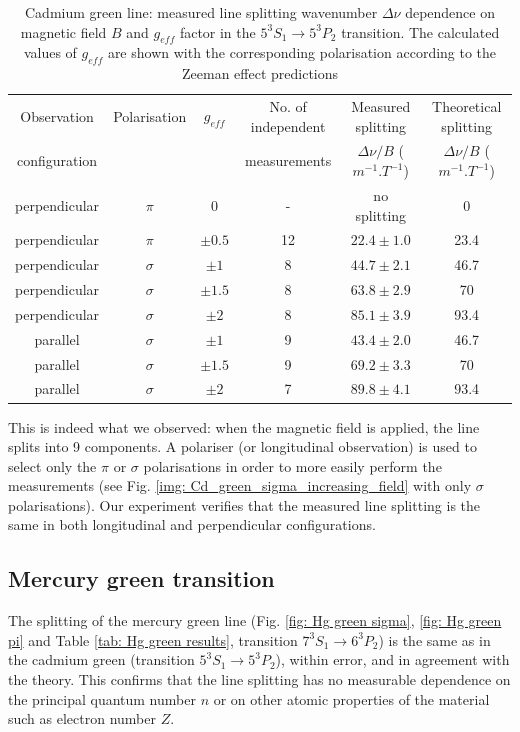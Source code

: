 \documentclass[11pt]{article}
\begin{document}
\begin{table}[h!]
    \centering
    \begin{tabular}{c|ccccc}
    \toprule
        Observation & Polarisation  & \( g_{eff} \) & No. of independent & Measured splitting  & Theoretical splitting \\
        configuration & & & measurements & $\Delta \nu / B$ ($\si{m^{-1}.T^{-1}}$) & $\Delta \nu / B$ ($\si{m^{-1}.T^{-1}}$) \\
    \midrule
        perpendicular & \( \pi \) & 0 & - & no splitting & 0\\
        perpendicular & \( \pi \) & $\pm 0.5$ & 12 & $22.4 \pm 1.0$ & 23.4\\
        perpendicular & \( \sigma \) & $\pm 1$ & 8 & $44.7 \pm 2.1$ & 46.7\\
        perpendicular & \( \sigma \) & $\pm 1.5$ & 8 & $63.8 \pm 2.9$ & 70\\
        perpendicular & \( \sigma \) & $\pm 2$ & 8 & $85.1 \pm 3.9$ & 93.4\\
        parallel & \( \sigma \) & $\pm 1$ & 9 & $43.4 \pm 2.0$ & 46.7\\
        parallel & \( \sigma \) & $\pm 1.5$ & 9 & $69.2 \pm 3.3$ & 70\\
        parallel & \( \sigma \) & $\pm 2$ & 7 & $89.8 \pm 4.1$ & 93.4\\
    \bottomrule
  \end{tabular}
    \captionsetup{justification=centering}
  \caption{Cadmium green line: measured line splitting wavenumber $\Delta \nu$ dependence on magnetic field $B$ and $g_{eff}$ factor in the $5^3 S_1\rightarrow 5^3 P_2$ transition. The calculated values of \(g_{eff}\) are shown with the corresponding polarisation according to the Zeeman effect predictions}
  \label{tab: Cd green g_eff}
\end{table}
This is indeed what we observed: when the magnetic field is applied, the line splits into 9 components. A polariser (or longitudinal observation) is used to select only the $\pi$ or $\sigma$ polarisations in order to more easily perform the measurements (see Fig. \ref{img: Cd_green_sigma_increasing_field} with only $\sigma$ polarisations). Our experiment verifies that the measured line splitting is the same in both longitudinal and perpendicular configurations. 

\subsection{Mercury green transition} \label{sec: Hg green}
The splitting of the mercury green line (Fig. \ref{fig: Hg green sigma}, \ref{fig: Hg green pi} and Table \ref{tab: Hg green results}, transition $7^3 S_1 \rightarrow 6^3P_2$) is the same as in the cadmium green (transition $5^3 S_1 \rightarrow 5^3P_2$), within error, and in agreement with the theory. This confirms that the line splitting has no measurable dependence on the principal quantum number $n$ or on other atomic properties of the material such as electron number $Z$. 
\end{document}
